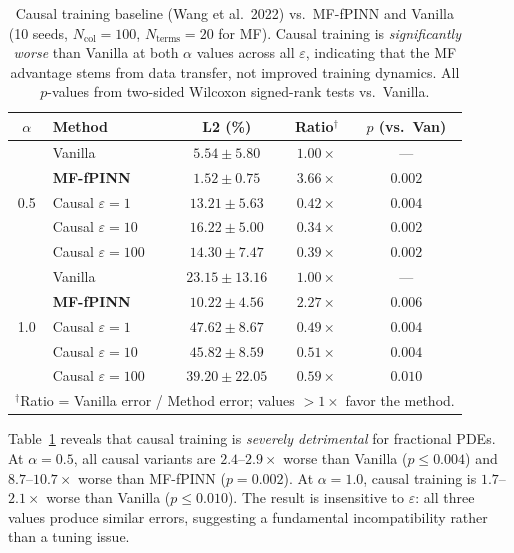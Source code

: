 \documentclass[11pt]{article}
\newcommand{\Ncol}{N_{\mathrm{col}}}
\begin{document}
\begin{table}[t]
\centering
\caption{Causal training baseline (Wang et al.\ 2022) vs.\ MF-fPINN and Vanilla (10 seeds, $\Ncol = 100$, $N_{\mathrm{terms}} = 20$ for MF). Causal training is \emph{significantly worse} than Vanilla at both $\alpha$ values across all $\varepsilon$, indicating that the MF advantage stems from data transfer, not improved training dynamics. All $p$-values from two-sided Wilcoxon signed-rank tests vs.\ Vanilla.}
\label{tab:causal}
\begin{tabular}{clccc}
\toprule
$\alpha$ & Method & L2 (\%) & Ratio$^\dagger$ & $p$ (vs.\ Van) \\
\midrule
\multirow{5}{*}{0.5}
& Vanilla           & $5.54 \pm 5.80$  & $1.00\times$ & --- \\
& \textbf{MF-fPINN} & $\mathbf{1.52 \pm 0.75}$  & $\mathbf{3.66\times}$ & $0.002$ \\
& Causal $\varepsilon{=}1$   & $13.21 \pm 5.63$ & $0.42\times$ & $0.004$ \\
& Causal $\varepsilon{=}10$  & $16.22 \pm 5.00$ & $0.34\times$ & $0.002$ \\
& Causal $\varepsilon{=}100$ & $14.30 \pm 7.47$ & $0.39\times$ & $0.002$ \\
\midrule
\multirow{5}{*}{1.0}
& Vanilla           & $23.15 \pm 13.16$ & $1.00\times$ & --- \\
& \textbf{MF-fPINN} & $\mathbf{10.22 \pm 4.56}$  & $\mathbf{2.27\times}$ & $0.006$ \\
& Causal $\varepsilon{=}1$   & $47.62 \pm 8.67$  & $0.49\times$ & $0.004$ \\
& Causal $\varepsilon{=}10$  & $45.82 \pm 8.59$  & $0.51\times$ & $0.004$ \\
& Causal $\varepsilon{=}100$ & $39.20 \pm 22.05$ & $0.59\times$ & $0.010$ \\
\bottomrule
\multicolumn{5}{l}{\small $^\dagger$Ratio = Vanilla error / Method error; values $>1\times$ favor the method.} \\
\end{tabular}
\end{table}

Table~\ref{tab:causal} reveals that causal training is \emph{severely detrimental} for fractional PDEs. At $\alpha = 0.5$, all causal variants are $2.4$--$2.9\times$ worse than Vanilla ($p \leq 0.004$) and $8.7$--$10.7\times$ worse than MF-fPINN ($p = 0.002$). At $\alpha = 1.0$, causal training is $1.7$--$2.1\times$ worse than Vanilla ($p \leq 0.010$). The result is insensitive to $\varepsilon$: all three values produce similar errors, suggesting a fundamental incompatibility rather than a tuning issue.
\end{document}
